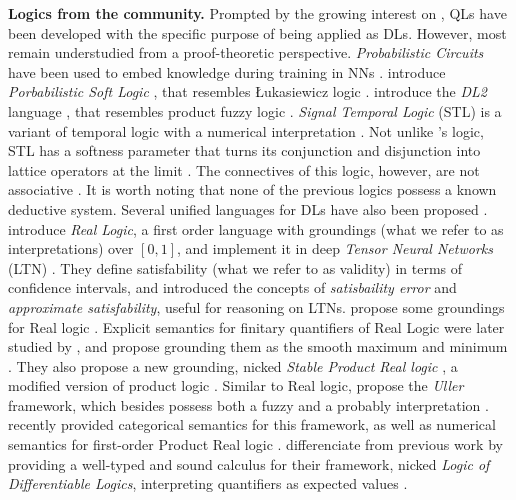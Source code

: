 \textbf{Logics from the \InAI{} community.} Prompted by the growing interest on \InAI{}, QLs have been developed with the specific purpose of being applied as DLs. However, most remain understudied from a proof-theoretic perspective. \emph{Probabilistic Circuits} have been used to embed knowledge during training in NNs \citep{NEURIPS2022_b6089408, braun2025tractablerepresentationlearningprobabilistic}. \citeauthor{kimmig2012short} introduce \emph{Porbabilistic Soft Logic} \citep{kimmig2012short}, that resembles  Łukasiewicz logic \cite{cintula2011handbook,prooffuzzy}. \citeauthor{fischer2019dl2} introduce the \emph{DL2} language \citep{fischer2019dl2}, that resembles product fuzzy logic \citep{cintula2011handbook, prooffuzzy}. \emph{Signal Temporal Logic} (STL) is a variant of temporal logic with a numerical interpretation \citep{varnai2020robustness}. Not unlike \citeauthor{capucci2024quantifiers}'s logic, STL has a softness parameter that turns its conjunction and disjunction into lattice operators at the limit \citep{varnai2020robustness}. The connectives of this logic, however, are not associative \citep{affeldt2024taming}. It is worth noting that none of the previous logics possess a known deductive system. Several unified languages for DLs have also been proposed \citep{badreddine2022logic, van2024uller, slusarz2023logic}. \citeauthor{serafini2016logic} introduce \emph{Real Logic}, a first order language with groundings (what we refer to as interpretations) over $[0,1]$, and implement it in deep \emph{Tensor Neural Networks} (LTN) \cite{badreddine2022logic}.   
They define satisfability (what we refer to as validity) in terms of confidence intervals, and introduced the concepts of \emph{satisbaility error} and \emph{approximate satisfability}, useful for reasoning on LTNs.  \citeauthor{van2022analyzing} propose some groundings for Real logic \citep{van2022analyzing}. Explicit semantics for finitary quantifiers of Real Logic were later studied by \citeauthor{badreddine2022logic}, and propose grounding them as the smooth maximum and minimum \citep{badreddine2022logic}. They also propose a new grounding, nicked \emph{Stable Product Real logic} \citep{badreddine2022logic}, a modified version of product logic \citep{van2022analyzing}. Similar to Real logic, \citeauthor{van2024uller} propose the \emph{Uller} framework, which besides possess both a fuzzy and a probably interpretation \citep{van2022analyzing}. \citeauthor{schellhorn2025muller} recently provided categorical semantics for this framework, as well as numerical semantics for first-order Product Real logic \citep{schellhorn2025muller}. \citeauthor{slusarz2023logic} differenciate from previous work by providing a well-typed and sound calculus for their framework, nicked \emph{Logic of Differentiable Logics}, interpreting quantifiers as expected values \citep{slusarz2023logic}. 

